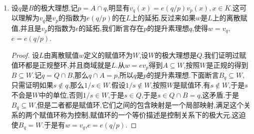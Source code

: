 \begin{enumerate}
\begin{proof}
		设$pB=q_1^{e_1}q_2^{e_2}\cdots q_s^{e_s}$和$q=q_1$,再设$qC=Q_1^{r_1}Q_2^{r_2}\cdots Q_t^{r_t}$和$Q=Q_1$.于是有$qC=Q_1^{r_1e_1}Q_2^{r_2e_1}\cdots Q_t^{r_te_1}\prod_i\mathscr{P}_i$,其中$\mathscr{P_i}$是$Q_2^{r_2}\cdots Q_t^{r_t}$的素理想分解,于是这些$\mathscr{P}_i$不包含$Q_1$,于是$e(Q/p)=e(Q/q)e(q/p)$.
		
		另一个等式是直接的:$f(Q/p)=[C/Q:A/p]=[C/Q:B/q]\cdot[B/q:A/p]=f(Q/q)f(q/p)$.
	\end{proof}
	\item 设$q$是$B$的极大理想,记$p=A\cap q$,明显有$v_q(x)=e(q/p)v_p(x),x\in K$.这可以理解为$v_q$是$v_p$的指数为$e(q/p)$的在$L$上的延拓.反过来如果$w$是$L$上的离散赋值,并且是$v_p$的指数为$e$的延拓,我们断言存在$p$的提升素理想$q$,使得$w=v_q$,$e=e(q/p)$.
	\begin{proof}
		
		设$L$由离散赋值$w$定义的赋值环为$W$,设$W$的极大理想是$Q$.我们证明过赋值环都是正规整环,并且商域就是$L$.从$w=ev_p$得到$A\subseteq W$,按照$W$是正规的得到$B\subseteq W$.记$q=Q\cap B$,那么$q\cap A=p$,所以$q$是$p$的提升素理想.下面断言$B_q\subseteq W$,只需证明如果$s\not\in q$,那么$1/s\in W$.假设$1/s\not\in W$,按照$W$是赋值环,有$s\not\in W$,于是$s$不会是$W$中的单位,否则$1/s\in W$,于是$s\in Q$,于是$s\in Q\cap B=q$,这矛盾.于是$B_q\subseteq W$,但是二者都是赋值环,它们之间的包含映射是一个局部映射,满足这个关系的两个赋值环称为控制,赋值环的一个等价描述是控制关系下的极大元,这迫使$B_q=W$.于是有$w=v_q$,$e=e(q/p)$.
	\end{proof}
\end{enumerate}

